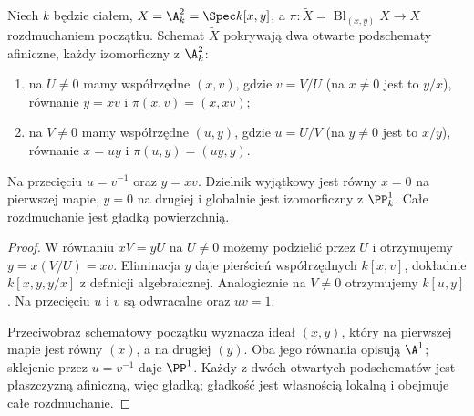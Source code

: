 \begin{twierdzenie}
\label{tw:ga5-plane-charts}
Niech $k$ będzie ciałem, $X=\A^2_k=\Spec k[x,y]$,
a $\pi:\widetilde X=\operatorname{Bl}_{(x,y)}X\to X$
rozdmuchaniem początku. Schemat $\widetilde X$ pokrywają
dwa otwarte podschematy afiniczne, każdy izomorficzny z
$\A^2_k$:
\begin{enumerate}[label=(\roman*)]
\item na $U\ne0$ mamy współrzędne $(x,v)$, gdzie
$v=V/U$ (na $x\ne0$ jest to $y/x$), równanie $y=xv$ i
$\pi(x,v)=(x,xv)$;
\item na $V\ne0$ mamy współrzędne $(u,y)$, gdzie
$u=U/V$ (na $y\ne0$ jest to $x/y$), równanie $x=uy$ i
$\pi(u,y)=(uy,y)$.
\end{enumerate}
Na przecięciu $u=v^{-1}$ oraz $y=xv$.
Dzielnik wyjątkowy jest równy $x=0$ na pierwszej
mapie, $y=0$ na drugiej i globalnie jest izomorficzny
z $\PP^1_k$. Całe rozdmuchanie jest gładką powierzchnią.
\end{twierdzenie}
\begin{proof}
W równaniu $xV=yU$ na $U\ne0$ możemy podzielić przez
$U$ i otrzymujemy $y=x(V/U)=xv$. Eliminacja $y$
daje pierścień współrzędnych $k[x,v]$, dokładnie
$k[x,y,y/x]$ z definicji algebraicznej. Analogicznie
na $V\ne0$ otrzymujemy $k[u,y]$. Na przecięciu
$u$ i $v$ są odwracalne oraz $uv=1$.

Przeciwobraz schematowy początku wyznacza ideał
$(x,y)$, który na pierwszej mapie jest równy $(x)$,
a na drugiej $(y)$. Oba jego równania opisują
$\A^1$; sklejenie przez $u=v^{-1}$ daje $\PP^1$.
Każdy z dwóch otwartych podschematów jest płaszczyzną afiniczną, więc gładką;
gładkość jest własnością lokalną i obejmuje całe
rozdmuchanie.
\end{proof}

